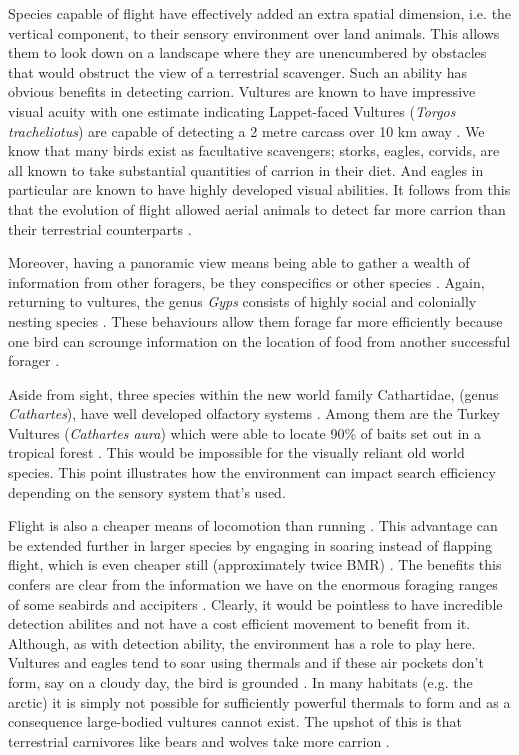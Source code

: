 \documentclass[a4paper,12pt]{article}
\begin{document}
Species capable of flight have effectively added an extra spatial dimension, i.e. the vertical component, to their sensory environment over land animals. This allows them to look down on a landscape where they are unencumbered by obstacles that would obstruct the view of a terrestrial scavenger. Such an ability has obvious benefits in detecting carrion. Vultures are known to have impressive visual acuity with one estimate indicating Lappet-faced Vultures (\textit{Torgos tracheliotus}) are capable of detecting a 2 metre carcass over 10 km away \citep{spiegel2013factors}. We know that many birds exist as facultative scavengers; storks, eagles, corvids, are all known to take substantial quantities of carrion in their diet. And eagles in particular are known to have highly developed visual abilities. It follows from this that the evolution of flight allowed aerial animals to detect far more carrion than their terrestrial counterparts \citep{AR:AR22815}.

Moreover, having a panoramic view means being able to gather a wealth of information from other foragers, be they conspecifics or other species \citep{jackson2008effect}. Again, returning to vultures, the genus \textit{Gyps} consists of highly social and colonially nesting species \citep{fernandez2015density}. These behaviours allow them forage far more efficiently because one bird can scrounge information on the location of food from another successful forager \citep{KaneVul}. 

Aside from sight, three species within the new world family Cathartidae, (genus \textit{Cathartes}), have well developed olfactory systems \citep{AR:AR22815}. Among them are the Turkey Vultures (\textit{Cathartes aura}) which were able to locate 90\% of baits set out in a tropical forest \citep{houston1986olfaction}. This would be impossible for the visually reliant old world species. This point illustrates how the environment can impact search efficiency depending on the sensory system that's used. 

Flight is also a cheaper means of locomotion than running \citep{tucker1975energetic}. This advantage can be extended further in larger species by engaging in soaring instead of flapping flight, which is even cheaper still (approximately twice BMR) \citep{hedenstrom1993migration}. The benefits this confers are clear from the information we have on the enormous foraging ranges of some seabirds and accipiters \citep{bamford2007ranging}. Clearly, it would be pointless to have incredible detection abilites and not have a cost efficient movement to benefit from it. Although, as with detection ability, the environment has a role to play here. Vultures and eagles tend to soar using thermals and if these air pockets don't form, say on a cloudy day, the bird is grounded \citep{mundy1992vultures}. In many habitats (e.g. the arctic) it is simply not possible for sufficiently powerful thermals to form and as a consequence large-bodied vultures cannot exist. The upshot of this is that terrestrial carnivores like bears and wolves take more carrion \citep{devault2003scavenging}. 
\end{document}
